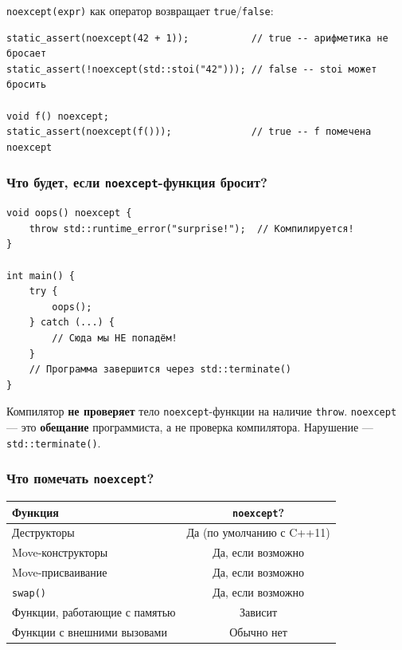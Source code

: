 \documentclass[a4paper,12pt]{article}
\begin{document}
\texttt{noexcept(expr)} как оператор возвращает \texttt{true}/\texttt{false}:

\begin{lstlisting}
static_assert(noexcept(42 + 1));           // true -- арифметика не бросает
static_assert(!noexcept(std::stoi("42"))); // false -- stoi может бросить

void f() noexcept;
static_assert(noexcept(f()));              // true -- f помечена noexcept
\end{lstlisting}

\subsubsection{Что будет, если \texttt{noexcept}-функция бросит?}

\begin{lstlisting}
void oops() noexcept {
    throw std::runtime_error("surprise!");  // Компилируется!
}

int main() {
    try {
        oops();
    } catch (...) {
        // Сюда мы НЕ попадём!
    }
    // Программа завершится через std::terminate()
}
\end{lstlisting}

Компилятор \textbf{не проверяет} тело \texttt{noexcept}-функции на наличие
\texttt{throw}. \texttt{noexcept} --- это \textbf{обещание} программиста,
а не проверка компилятора. Нарушение --- \texttt{std::terminate()}.

\subsubsection{Что помечать \texttt{noexcept}?}

\begin{center}
\begin{tabular}{lc}
\toprule
\textbf{Функция} & \texttt{noexcept}? \\
\midrule
Деструкторы                    & Да (по умолчанию с C++11) \\
Move-конструкторы              & Да, если возможно \\
Move-присваивание              & Да, если возможно \\
\texttt{swap()}                & Да, если возможно \\
Функции, работающие с памятью  & Зависит \\
Функции с внешними вызовами    & Обычно нет \\
\bottomrule
\end{tabular}
\end{center}
\end{document}
